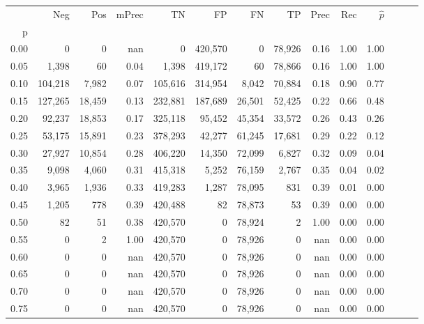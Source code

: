 \begin{tabular}{rrrrrrrrrrrrrr}
\toprule
{} &      Neg &     Pos & mPrec &       TN &       FP &      FN &      TP &  Prec &   Rec & $\hat{p}$ \\
p    &          &         &       &          &          &         &         &       &       &           \\
\midrule
0.00 &        0 &       0 &   nan &        0 &  420,570 &       0 &  78,926 &  0.16 &  1.00 &      1.00 \\
0.05 &    1,398 &      60 &  0.04 &    1,398 &  419,172 &      60 &  78,866 &  0.16 &  1.00 &      1.00 \\
0.10 &  104,218 &   7,982 &  0.07 &  105,616 &  314,954 &   8,042 &  70,884 &  0.18 &  0.90 &      0.77 \\
0.15 &  127,265 &  18,459 &  0.13 &  232,881 &  187,689 &  26,501 &  52,425 &  0.22 &  0.66 &      0.48 \\
0.20 &   92,237 &  18,853 &  0.17 &  325,118 &   95,452 &  45,354 &  33,572 &  0.26 &  0.43 &      0.26 \\
0.25 &   53,175 &  15,891 &  0.23 &  378,293 &   42,277 &  61,245 &  17,681 &  0.29 &  0.22 &      0.12 \\
0.30 &   27,927 &  10,854 &  0.28 &  406,220 &   14,350 &  72,099 &   6,827 &  0.32 &  0.09 &      0.04 \\
0.35 &    9,098 &   4,060 &  0.31 &  415,318 &    5,252 &  76,159 &   2,767 &  0.35 &  0.04 &      0.02 \\
0.40 &    3,965 &   1,936 &  0.33 &  419,283 &    1,287 &  78,095 &     831 &  0.39 &  0.01 &      0.00 \\
0.45 &    1,205 &     778 &  0.39 &  420,488 &       82 &  78,873 &      53 &  0.39 &  0.00 &      0.00 \\
0.50 &       82 &      51 &  0.38 &  420,570 &        0 &  78,924 &       2 &  1.00 &  0.00 &      0.00 \\
0.55 &        0 &       2 &  1.00 &  420,570 &        0 &  78,926 &       0 &   nan &  0.00 &      0.00 \\
0.60 &        0 &       0 &   nan &  420,570 &        0 &  78,926 &       0 &   nan &  0.00 &      0.00 \\
0.65 &        0 &       0 &   nan &  420,570 &        0 &  78,926 &       0 &   nan &  0.00 &      0.00 \\
0.70 &        0 &       0 &   nan &  420,570 &        0 &  78,926 &       0 &   nan &  0.00 &      0.00 \\
0.75 &        0 &       0 &   nan &  420,570 &        0 &  78,926 &       0 &   nan &  0.00 &      0.00 \\

\end{tabular}

